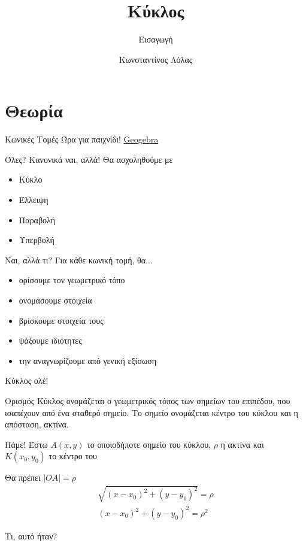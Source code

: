 \documentclass[greek]{beamer}
\title{Κύκλος}
\subtitle{Εισαγωγή}
\author[Λόλας]{Κωνσταντίνος Λόλας}
\date{}
\begin{document}
\begin{frame}
 \titlepage
\end{frame}

\section{Θεωρία}
\begin{frame}{Κωνικές Τομές}
 Ώρα για παιχνίδι!
 \href{https://www.geogebra.org/m/pCg8NFVT}{Geogebra}
\end{frame}

\begin{frame}{Όλες? Κανονικά ναι, αλλά!}
 Θα ασχοληθούμε με
 \begin{itemize}
  \item Κύκλο
  \item Έλλειψη
  \item Παραβολή
  \item Υπερβολή
 \end{itemize}
\end{frame}

\begin{frame}{Ναι, αλλά τι?}
 Για κάθε κωνική τομή, θα...
 \begin{itemize}
  \item<1-> ορίσουμε τον γεωμετρικό τόπο
  \item<2-> ονομάσουμε στοιχεία
  \item<3-> βρίσκουμε στοιχεία τους
  \item<4-> ψάξουμε ιδιότητες
  \item<5-> την αναγνωρίζουμε από γενική εξίσωση
 \end{itemize}
\end{frame}

\begin{frame}{Κύκλος ολέ!}
 \begin{block}{Ορισμός}
  Κύκλος ονομάζεται ο γεωμετρικός τόπος των σημείων του επιπέδου, που ισαπέχουν από ένα σταθερό σημείο. Το σημείο ονομάζεται κέντρο του κύκλου και η απόσταση, ακτίνα.
 \end{block}
\end{frame}

\begin{frame}{Πάμε!}
  Έστω $A(x,y)$ το οποιοδήποτε σημείο του κύκλου, $ρ$ η ακτίνα και $Κ(x_0,y_0)$ το κέντρο του

  Θα πρέπει $|ΟΑ|=ρ$
 \begin{align*}
  \sqrt{(x-x_0)^2+(y-y_0)^2}=ρ \\
  (x-x_0)^2+(y-y_0)^2=ρ^2
 \end{align*}

  Τι, αυτό ήταν?

\end{frame}
\end{document}
